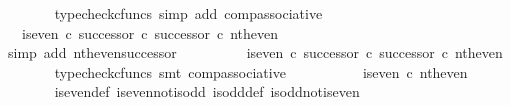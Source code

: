 \begin{isabellebody}
\ \ \ \ \ \ \isamarkupfalse%
\ {\isacharparenleft}{\kern0pt}typecheck{\isacharunderscore}{\kern0pt}cfuncs{\isacharcomma}{\kern0pt}\ simp\ add{\isacharcolon}{\kern0pt}\ comp{\isacharunderscore}{\kern0pt}associative{}{\isacharparenright}{\kern0pt}\isanewline
\ \ \ \ \isamarkupfalse%
\ \isamarkupfalse%
\ {\isachardoublequoteopen}{\isachardot}{\kern0pt}{\isachardot}{\kern0pt}{\isachardot}{\kern0pt}\ {\isacharequal}{\kern0pt}\ is{\isacharunderscore}{\kern0pt}even\ {\isasymcirc}\isactrlsub c\ successor\ {\isasymcirc}\isactrlsub c\ successor\ {\isasymcirc}\isactrlsub c\ nth{\isacharunderscore}{\kern0pt}even{\isachardoublequoteclose}\isanewline
\ \ \ \ \ \ \isamarkupfalse%
\ {\isacharparenleft}{\kern0pt}simp\ add{\isacharcolon}{\kern0pt}\ nth{\isacharunderscore}{\kern0pt}even{\isacharunderscore}{\kern0pt}successor{}{\isacharparenright}{\kern0pt}\isanewline
\ \ \ \ \isamarkupfalse%
\ \isamarkupfalse%
\ {\isachardoublequoteopen}{\isachardot}{\kern0pt}{\isachardot}{\kern0pt}{\isachardot}{\kern0pt}\ {\isacharequal}{\kern0pt}\ {\isacharparenleft}{\kern0pt}{\isacharparenleft}{\kern0pt}is{\isacharunderscore}{\kern0pt}even\ {\isasymcirc}\isactrlsub c\ successor{\isacharparenright}{\kern0pt}\ {\isasymcirc}\isactrlsub c\ successor{\isacharparenright}{\kern0pt}\ {\isasymcirc}\isactrlsub c\ nth{\isacharunderscore}{\kern0pt}even{\isachardoublequoteclose}\isanewline
\ \ \ \ \ \ \isamarkupfalse%
\ {\isacharparenleft}{\kern0pt}typecheck{\isacharunderscore}{\kern0pt}cfuncs{\isacharcomma}{\kern0pt}\ smt\ comp{\isacharunderscore}{\kern0pt}associative{}{\isacharparenright}{\kern0pt}\isanewline
\ \ \ \ \isamarkupfalse%
\ \isamarkupfalse%
\ {\isachardoublequoteopen}{\isachardot}{\kern0pt}{\isachardot}{\kern0pt}{\isachardot}{\kern0pt}\ {\isacharequal}{\kern0pt}\ \ is{\isacharunderscore}{\kern0pt}even\ {\isasymcirc}\isactrlsub c\ nth{\isacharunderscore}{\kern0pt}even{\isachardoublequoteclose}\isanewline
\ \ \ \ \ \ \isamarkupfalse%
\ is{\isacharunderscore}{\kern0pt}even{\isacharunderscore}{\kern0pt}def{}\ is{\isacharunderscore}{\kern0pt}even{\isacharunderscore}{\kern0pt}not{\isacharunderscore}{\kern0pt}is{\isacharunderscore}{\kern0pt}odd\ is{\isacharunderscore}{\kern0pt}odd{\isacharunderscore}{\kern0pt}def{}\ is{\isacharunderscore}{\kern0pt}odd{\isacharunderscore}{\kern0pt}not{\isacharunderscore}{\kern0pt}is{\isacharunderscore}{\kern0pt}even\ \isamarkupfalse%

\end{isabellebody}
